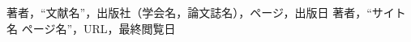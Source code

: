 \cite{文献1}

\begin{thebibliography}{9}
     著者，``文献名''，出版社（学会名，論文誌名），ページ，出版日
     著者，``サイト名 ページ名''，URL，最終閲覧日
\end{thebibliography}
